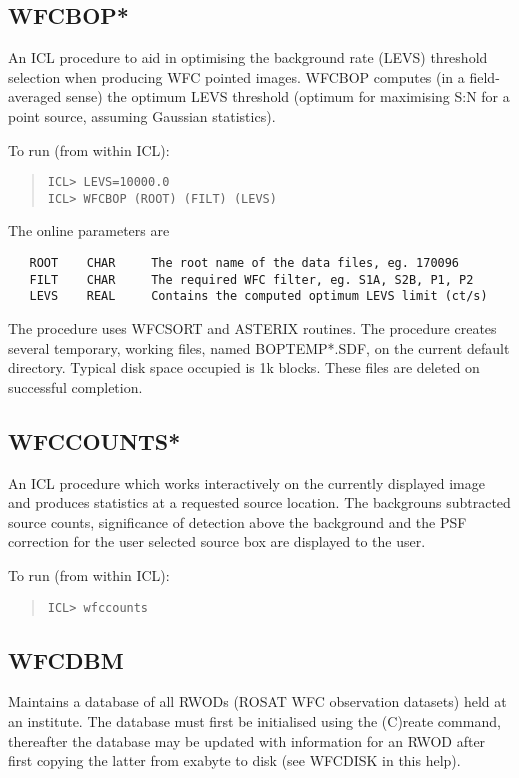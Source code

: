 \documentclass{book}
\renewcommand{\_}{{\tt\char'137}}     %
\begin{document}
\subsection{WFCBOP*}
An ICL procedure to aid in optimising the background rate (LEVS)
threshold selection when producing WFC pointed images. WFCBOP computes
(in a field-averaged sense) the optimum LEVS threshold (optimum for
maximising S:N for a point source, assuming Gaussian statistics).
 
To run (from within ICL):
\begin{quote}\begin{verbatim}
ICL> LEVS=10000.0
ICL> WFCBOP (ROOT) (FILT) (LEVS)
\end{verbatim}\end{quote}
The online parameters are
\begin{verbatim}
   ROOT    CHAR     The root name of the data files, eg. 170096
   FILT    CHAR     The required WFC filter, eg. S1A, S2B, P1, P2
   LEVS    REAL     Contains the computed optimum LEVS limit (ct/s)
\end{verbatim}
The procedure uses WFCSORT and ASTERIX routines. The procedure creates
several temporary, working files, named BOPTEMP*.SDF, on the current
default directory. Typical disk space occupied is 1k blocks. These
files are deleted on successful completion.
 
\subsection{WFCCOUNTS*}
An ICL procedure which works interactively on the currently displayed
image and produces statistics at a requested source location. The
backgrouns subtracted source counts, significance of detection above the
background and the PSF correction for the user selected source box are
displayed to the user.
 
To run (from within ICL):
\begin{quote}\begin{verbatim}
ICL> wfccounts
\end{verbatim}\end{quote}
\subsection{WFCDBM}
Maintains a database of all RWODs (ROSAT WFC observation datasets) held
at an institute. The database must first be initialised using the
(C)reate command, thereafter the database may be updated with
information for an RWOD after first copying the latter from exabyte to
disk (see WFCDISK in this help).
 
\end{document}
